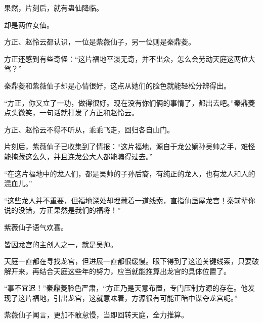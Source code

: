 \begin{this_body}
果然，片刻后，就有蛊仙降临。

却是两位女仙。

方正、赵怜云都认识，一位是紫薇仙子，另一位则是秦鼎菱。

方正还感到有些奇怪：“这片福地平淡无奇，并不出众，怎么会劳动天庭这两位大驾？”

秦鼎菱和紫薇仙子却是心情很好，这点从她们的脸色就能轻松分辨得出。

“方正，你又立了一功，做得很好。现在没有你们俩的事情了，都出去吧。”秦鼎菱点头微笑，一句话就打发了方正和赵怜云。

方正、赵怜云不得不听从，乖乖飞走，回归各自山门。

片刻后，紫薇仙子已收集到了情报：“这片福地，源自于龙公嫡孙吴帅之手，难怪能掩藏这么久，并且连龙公大人都能骗得过去。”

“在这片福地中的龙人们，都是吴帅的子孙后裔，有纯正的龙人，也有龙人和人的混血儿。”

“这些龙人并不重要，但福地深处却埋藏着一道线索，直指仙蛊屋龙宫！秦前辈你说的没错，方正果然是我们的福将！”

紫薇仙子语气欢喜。

皆因龙宫的主创人之一，就是吴帅。

天庭一直都在寻找龙宫，但进展一直都很缓慢。眼下得到了这道关键线索，只要破解开来，再结合天庭这些年的努力，应当就能推算出龙宫的具体位置了。

“事不宜迟！”秦鼎菱脸色严肃，“方正乃是天意布置，专门压制方源的存在。他发现了这片福地，引出龙宫，这就意味着，方源很有可能正暗中谋夺龙宫呢。”

紫薇仙子闻言，更加不敢怠慢，当即回转天庭，全力推算。

\end{this_body}

